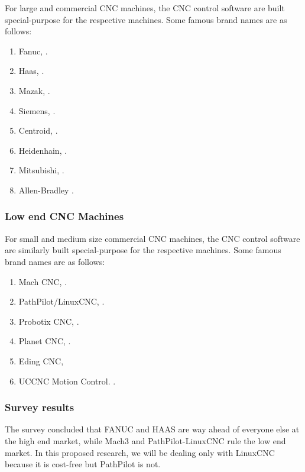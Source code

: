 For large and commercial CNC machines, the CNC control software are built special-purpose for the respective machines. Some famous brand names are as follows:
\begin{enumerate}
	\item Fanuc, \cite{FANUC_CNC}.
	\item Haas, \cite{HAAS_CNC}.
	\item Mazak, \cite{MAZAK_CNC}.
	\item Siemens, \cite{SIEMENS_CNC}.
	\item Centroid, \cite{CENTROID_CNC}.
	\item Heidenhain, \cite{HEIDENHAIN_CNC}.
	\item Mitsubishi, \cite{MITSUBISHI_CNC}.
	\item Allen-Bradley \cite{ALLEN-BRADLEY_CNC}.
\end{enumerate}

\subsubsection{Low end CNC Machines}
For small and medium size commercial CNC machines, the CNC control software are similarly built special-purpose for the respective machines. Some famous brand names are as follows:
\begin{enumerate}
	\item Mach CNC, \cite{MACH_CNC}.
	\item PathPilot/LinuxCNC, \cite{PATHPILOT_CNC}.
	\item Probotix CNC, \cite{PROBOTIX_CNC}.
	\item Planet CNC, \cite{PLANET_CNC}.
	\item Eding CNC, \cite{EDING_CNC}
	\item UCCNC Motion Control. \cite{UCCNC_CNC}.
\end{enumerate}
\subsubsection{Survey results}

\begin{tcolorbox}[colback=green!15!white,colframe=red!75!black,title=Research consideration no. 1]
The survey concluded that FANUC and HAAS are way ahead of everyone else at the high end market, while Mach3 and PathPilot-LinuxCNC rule the low end market. In this proposed research, we will be dealing only with LinuxCNC because it is cost-free but PathPilot is not.
\end{tcolorbox}


